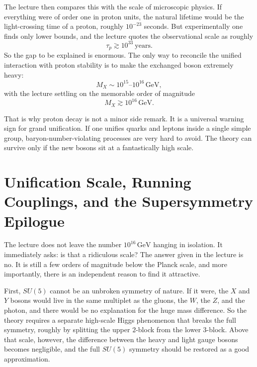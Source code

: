 The lecture then compares this with the scale of microscopic physics. If everything were of order one in proton units, the natural lifetime would be the light-crossing time of a proton, roughly \(10^{-23}\) seconds. But experimentally one finds only lower bounds, and the lecture quotes the observational scale as roughly
\begin{equation}
\tau_p \gtrsim 10^{33}\ \text{years}.
\end{equation}
So the gap to be explained is enormous. The only way to reconcile the unified interaction with proton stability is to make the exchanged boson extremely heavy:
\begin{equation}
M_X \sim 10^{15}\text{--}10^{16}\,\mathrm{GeV},
\end{equation}
with the lecture settling on the memorable order of magnitude
\begin{equation}
M_X \gtrsim 10^{16}\,\mathrm{GeV}.
\end{equation}

That is why proton decay is not a minor side remark. It is a universal warning sign for grand unification. If one unifies quarks and leptons inside a single simple group, baryon-number-violating processes are very hard to avoid. The theory can survive only if the new bosons sit at a fantastically high scale.

\section{Unification Scale, Running Couplings, and the Supersymmetry Epilogue}

The lecture does not leave the number \(10^{16}\,\mathrm{GeV}\) hanging in isolation. It immediately asks: is that a ridiculous scale? The answer given in the lecture is no. It is still a few orders of magnitude below the Planck scale, and more importantly, there is an independent reason to find it attractive.

First, \(SU(5)\) cannot be an unbroken symmetry of nature. If it were, the \(X\) and \(Y\) bosons would live in the same multiplet as the gluons, the \(W\), the \(Z\), and the photon, and there would be no explanation for the huge mass difference. So the theory requires a separate high-scale Higgs phenomenon that breaks the full symmetry, roughly by splitting the upper \(2\)-block from the lower \(3\)-block. Above that scale, however, the difference between the heavy and light gauge bosons becomes negligible, and the full \(SU(5)\) symmetry should be restored as a good approximation.

